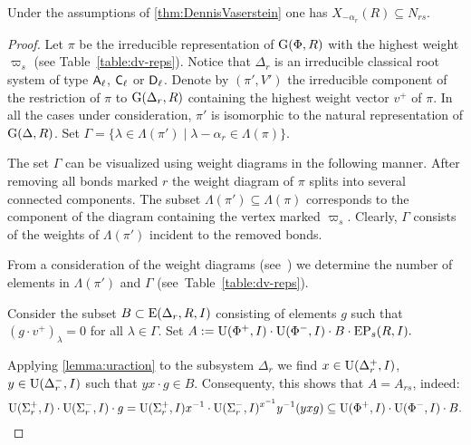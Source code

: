 \begin{lemma}\label{lemma:Stein_reduction}
Under the assumptions of \cref{thm:DennisVaserstein} one has $X_{-\alpha_r}(R) \subseteq N_{rs}.$
\end{lemma}
\begin{proof}
Let $\pi$ be the irreducible representation of $\operatorname{G}(\Phi, R)$ with the highest weight $\varpi_s$ (see Table~\ref{table:dv-reps}).
Notice that $\Delta_r$ is an irreducible classical root system of type $\mathsf{A}_\ell$, $\mathsf{C}_\ell$ or $\mathsf{D}_\ell$.
Denote by $(\pi', V')$ the irreducible component of the restriction of $\pi$ to $\operatorname{G}(\Delta_r, R)$ containing the highest weight vector $v^+$ of $\pi$.
In all the cases under consideration, $\pi'$ is isomorphic to the natural representation of $\operatorname{G}(\Delta, R)$.
Set $\Gamma = \{\lambda \in \Lambda(\pi') \mid \lambda - \alpha_r \in \Lambda(\pi) \}.$

The set $\Gamma$ can be visualized using weight diagrams in the following manner.
After removing all bonds marked $r$ the weight diagram of $\pi$ splits into several connected components.
The subset $\Lambda(\pi') \subseteq \Lambda(\pi)$ corresponds to the component of the diagram containing the vertex marked $\varpi_s$.
Clearly, $\Gamma$ consists of the weights of $\Lambda(\pi')$ incident to the removed bonds.

From a consideration of the weight diagrams (see~\cite{PSV98}) we determine the number of elements in $\Lambda(\pi')$ and $\Gamma$ (see~Table~\ref{table:dv-reps}).

Consider the subset $B \subset \operatorname{E}(\Delta_r, R, I)$ consisting of elements $g$ such that $(g \cdot v^+)_\lambda = 0$ for all $\lambda\in\Gamma$.
Set $A:=\operatorname{U}(\Phi^+, I)\cdot \operatorname{U}(\Phi^-, I) \cdot B \cdot \operatorname{EP}_s(R, I).$

Applying \cref{lemma:uraction} to the subsystem $\Delta_r$ we find
$x\in\operatorname{U}(\Delta_r^+, I)$, $y\in \operatorname{U}(\Delta_r^-, I)$ such that $yx\cdot g \in B$.
Consequenty, this shows that $A = A_{rs}$, indeed:
\begin{equation*} \operatorname{U}(\Sigma^+_r, I) \cdot \operatorname{U}(\Sigma^-_r, I) \cdot g = \operatorname{U}(\Sigma^+_r, I) x^{-1} \cdot \operatorname{U}(\Sigma^-_r, I)^{x^{-1}} y^{-1} (yxg) \subseteq \operatorname{U}(\Phi^+, I) \cdot \operatorname{U}(\Phi^-, I) \cdot B. \end{equation*}


\end{proof}
